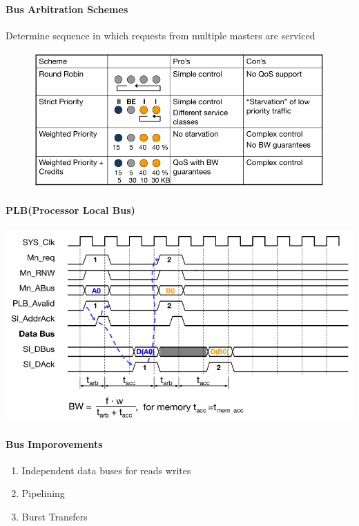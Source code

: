 \documentclass[english]{latex4ei/latex4ei_sheet}
\begin{document}
\paragraph{Bus Arbitration Schemes} Determine sequence in which requests from multiple masters are serviced
\begin{figure}
    \centering
    \includegraphics[width=1\linewidth]{images//6.Interconnects/BusArbitrationSchemes.png}
\end{figure}

\paragraph{PLB(Processor Local Bus)}

\begin{center}
    \includegraphics[width=0.75\linewidth]{images//6.Interconnects/PLBTiming.png}
\end{center}

\paragraph{Bus Imporovements}
\begin{enumerate}
    \item Independent data buses for reads writes
    \item Pipelining
    \item Burst Transfers
\end{enumerate}
\end{document}
